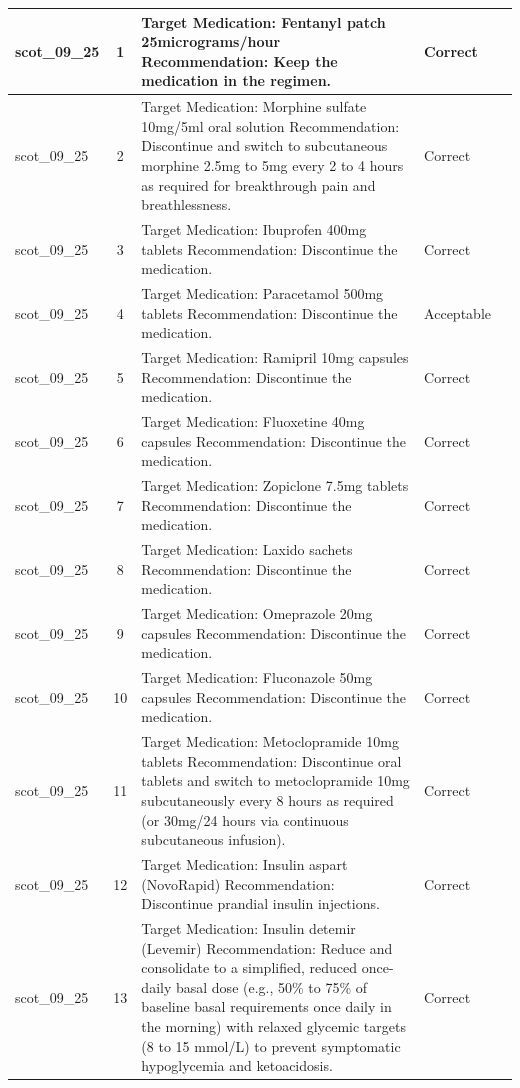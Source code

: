 \begin{longtable}{|p{1.45cm}|c|p{10.2cm}|p{1.55cm}|p{2.3cm}|}
\hline
scot\_09\_25 & 1 & Target Medication: Fentanyl patch 25micrograms/hour Recommendation: Keep the medication in the regimen. & Correct &  \\
\hline
scot\_09\_25 & 2 & Target Medication: Morphine sulfate 10mg/5ml oral solution Recommendation: Discontinue and switch to subcutaneous morphine 2.5mg to 5mg every 2 to 4 hours as required for breakthrough pain and breathlessness. & Correct &  \\
\hline
scot\_09\_25 & 3 & Target Medication: Ibuprofen 400mg tablets Recommendation: Discontinue the medication. & Correct &  \\
\hline
scot\_09\_25 & 4 & Target Medication: Paracetamol 500mg tablets Recommendation: Discontinue the medication. & Acceptable &  \\
\hline
scot\_09\_25 & 5 & Target Medication: Ramipril 10mg capsules Recommendation: Discontinue the medication. & Correct &  \\
\hline
scot\_09\_25 & 6 & Target Medication: Fluoxetine 40mg capsules Recommendation: Discontinue the medication. & Correct &  \\
\hline
scot\_09\_25 & 7 & Target Medication: Zopiclone 7.5mg tablets Recommendation: Discontinue the medication. & Correct &  \\
\hline
scot\_09\_25 & 8 & Target Medication: Laxido sachets Recommendation: Discontinue the medication. & Correct &  \\
\hline
scot\_09\_25 & 9 & Target Medication: Omeprazole 20mg capsules Recommendation: Discontinue the medication. & Correct &  \\
\hline
scot\_09\_25 & 10 & Target Medication: Fluconazole 50mg capsules Recommendation: Discontinue the medication. & Correct &  \\
\hline
scot\_09\_25 & 11 & Target Medication: Metoclopramide 10mg tablets Recommendation: Discontinue oral tablets and switch to metoclopramide 10mg subcutaneously every 8 hours as required (or 30mg/24 hours via continuous subcutaneous infusion). & Correct &  \\
\hline
scot\_09\_25 & 12 & Target Medication: Insulin aspart (NovoRapid) Recommendation: Discontinue prandial insulin injections. & Correct &  \\
\hline
scot\_09\_25 & 13 & Target Medication: Insulin detemir (Levemir) Recommendation: Reduce and consolidate to a simplified, reduced once-daily basal dose (e.g., 50\% to 75\% of baseline basal requirements once daily in the morning) with relaxed glycemic targets (8 to 15 mmol/L) to prevent symptomatic hypoglycemia and ketoacidosis. & Correct &  \\

\end{longtable}
